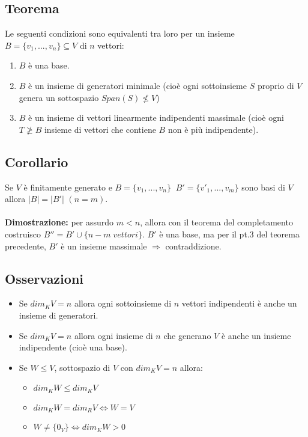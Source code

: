  \subsection{Teorema}
 Le seguenti condizioni sono equivalenti tra loro per un insieme $B=\{v_1,...,v_n\}\subseteq V$ di $n$ vettori:
 \begin{enumerate}
 	\item $B$ è una base.
 	\item $B$ è un insieme di generatori minimale (cioè ogni sottoinsieme $S$ proprio di $V$ genera un sottospazio $Span(S)\not\leq V$)
 	\item $B$ è un insieme di vettori linearmente indipendenti massimale (cioè ogni $T\not\geq B$ insieme di vettori che contiene $B$ non è più indipendente).
 \end{enumerate}

 \subsection{Corollario}
 Se $V$ è finitamente generato e $B=\{v_1,...,v_n\}\;\;B'=\{v'_1,...,v_m\}$ sono basi di $V$ allora $|B|=|B'|$ $(n=m)$.
 \\
 \\\textbf{Dimostrazione:} per assurdo $m<n$, allora con il teorema del completamento costruisco $B''=B'\cup\{n-m\;vettori\}$. $B'$ è una base, ma per il pt.3 del teorema precedente, $B'$ è un insieme massimale $\Rightarrow$ contraddizione.

\subsection{Osservazioni}
\begin{itemize}
	\item Se $dim_KV=n$ allora ogni sottoinsieme di $n$ vettori indipendenti è anche un insieme di generatori.
	\item Se $dim_KV=n$ allora ogni insieme di $n$ che generano $V$ è anche un insieme indipendente (cioè una base).
	\item Se $W\leq V$, sottospazio di $V$ con $dim_KV=n$ allora:
	\begin{itemize}
		\item $dim_KW\leq dim_KV$
		\item $dim_KW=dim_RV\Leftrightarrow W=V$
		\item $W\neq\{0_V\}\Leftrightarrow dim_KW>0$
	\end{itemize}
\end{itemize}


